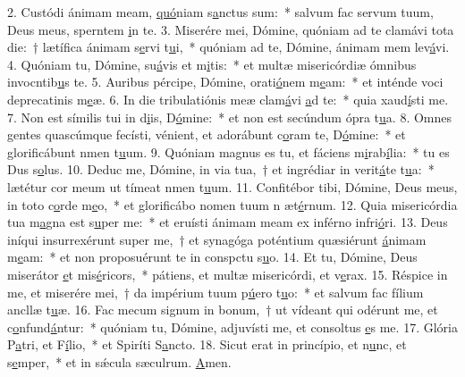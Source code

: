 2. Custódi ánimam meam, \uline{quó}niam s\uline{a}nctus sum:~* salvum fac servum tuum, Deus meus, sperntem \uline{i}n te.
3. Miserére mei, Dómine, quóniam ad te clamávi tota die:~† lætífica ánimam s\uline{e}rvi t\uline{u}i,~* quóniam ad te, Dómine, ánimam mem lev\uline{á}vi.
4. Quóniam tu, Dómine, su\uline{á}vis et m\uline{i}tis:~* et multæ misericórdiæ ómnibus invocntib\uline{u}s te.
5. Auribus pércipe, Dómine, orati\uline{ó}nem m\uline{e}am:~* et inténde voci deprecatinis m\uline{e}æ.
6. In die tribulatiónis meæ clam\uline{á}vi \uline{a}d te:~* quia xaud\uline{í}sti me.
7. Non est símilis tui in d\uline{i}is, D\uline{ó}mine:~* et non est secúndum ópra t\uline{u}a.
8. Omnes gentes quascúmque fecísti, vénient, et adorábunt c\uline{o}ram te, D\uline{ó}mine:~* et glorificábunt nmen t\uline{u}um.
9. Quóniam magnus es tu, et fáciens m\uline{i}rab\uline{í}lia:~* tu es Dus s\uline{o}lus.
10. Deduc me, Dómine, in via tua,~† et ingrédiar in verit\uline{á}te t\uline{u}a:~* lætétur cor meum ut tímeat nmen t\uline{u}um.
11. Confitébor tibi, Dómine, Deus meus, in toto c\uline{o}rde m\uline{e}o,~* et glorificábo nomen tuum n æt\uline{é}rnum.
12. Quia misericórdia tua m\uline{a}gna est s\uline{u}per me:~* et eruísti ánimam meam ex inférno infri\uline{ó}ri.
13. Deus iníqui insurrexérunt super me,~† et synagóga poténtium quæsiérunt \uline{á}nimam m\uline{e}am:~* et non proposuérunt te in conspctu s\uline{u}o.
14. Et tu, Dómine, Deus miserátor \uline{e}t mis\uline{é}ricors,~* pátiens, et multæ misericórdi, et v\uline{e}rax.
15. Réspice in me, et miserére mei,~† da impérium tuum p\uline{ú}ero t\uline{u}o:~* et salvum fac fílium ancllæ t\uline{u}æ.
16. Fac mecum signum in bonum,~† ut vídeant qui odérunt me, et c\uline{o}nfund\uline{á}ntur:~* quóniam tu, Dómine, adjuvísti me, et consoltus \uline{e}s me.
17. Glória P\uline{a}tri, et F\uline{í}lio,~* et Spiríti S\uline{a}ncto.
18. Sicut erat in princípio, et n\uline{u}nc, et s\uline{e}mper,~* et in sǽcula sæculrum. \uline{A}men.
